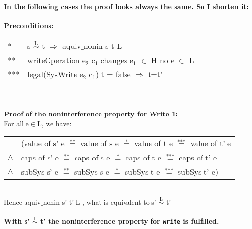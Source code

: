 \textbf{In the following cases the proof looks always the same. So I shorten it:} \\ \\
\textbf{Preconditions:} \\ 
\begin{tabular}{ll}
* & s $\overset{\text{L}}{\sim}$ t $\Rightarrow$ aquiv$\_$nonin s t L	\\ 
** & writeOperation e$_2$ c$_1$  changes e$_1$ $\in$ H no e $\in$ L \\
*** & legal(SysWrite e$_2$ c$_1$) t = false $\Rightarrow$ t=t'
\end{tabular} \\ \\ 
\textbf{Proof of the noninterference property for Write 1:} \\ 
For all e$\in$L, we have: \\
\begin{tabular}{ll}
& (value$\_$of s' e $\overset{\text{**}}{=}$ value$\_$of s e $\overset{\text{*}}{=}$ value$\_$of t e $\overset{\text{***}}{=}$ value$\_$of t' e \\
$\wedge$ & caps$\_$of s' e $\overset{\text{**}}{=}$ caps$\_$of s e $\overset{\text{*}}{=}$ caps$\_$of t e $\overset{\text{***}}{=}$ caps$\_$of t' e \\
$\wedge$ & subSys s' e $\overset{\text{**}}{=}$ subSys s e $\overset{\text{*}}{=}$ subSys t e $\overset{\text{***}}{=}$ subSys t' e)
\end{tabular} \\
Hence aquiv$\_$nonin s' t' L , what is equivalent to s' $\overset{\text{L}}{\sim}$ t' \\ \\
\textbf{With s' $\overset{\text{L}}{\sim}$ t' the noninterference property for \texttt{write} is fulfilled.} 